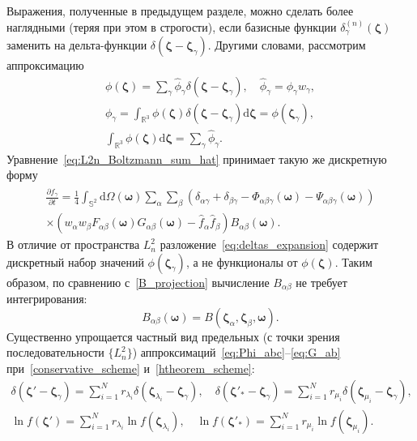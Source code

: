 \documentclass{article}
\newcommand{\dd}{\mathrm{d}}
\newcommand{\pder}[2][]{\frac{\partial#1}{\partial#2}}
\newcommand{\dzeta}{\boldsymbol{\dd\zeta}}
\newcommand{\bzeta}{\boldsymbol{\zeta}}
\newcommand{\bomega}{\boldsymbol{\omega}}
\begin{document}
Выражения, полученные в предыдущем разделе, можно сделать более наглядными (теряя при этом в строгости),
если базисные функции \(\delta^{(n)}_\gamma(\bzeta)\) заменить на дельта-функции \(\delta(\bzeta-\bzeta_\gamma)\).
Другими словами, рассмотрим аппроксимацию
\begin{gather}
    \phi(\bzeta) = \sum_\gamma \hat{\phi}_\gamma \delta(\bzeta-\bzeta_\gamma),
    \quad \hat{\phi}_\gamma = \phi_\gamma w_\gamma, \label{eq:deltas_expansion} \\
    \phi_\gamma = \int_{\mathbb{R}^3} \phi(\bzeta) \delta(\bzeta-\bzeta_\gamma) \dzeta = \phi(\bzeta_\gamma), \label{eq:deltas_coords} \\
    \int_{\mathbb{R}^3} \phi(\bzeta)\dzeta = \sum_\gamma \hat{\phi}_\gamma. \label{eq:deltas_integral}
\end{gather}
Уравнение~\eqref{eq:L2n_Boltzmann_sum_hat} принимает такую же дискретную форму
\begin{multline}\label{eq:deltas_Boltzmann_sum_hat}
    \pder[\hat{f}_\gamma]{t} =
        \frac14\int_{\mathbb{S}^2}\dd\Omega(\bomega) \sum_\alpha \sum_\beta
        \left(\delta_{\alpha\gamma} + \delta_{\beta\gamma}
            - \Phi_{\alpha\beta\gamma}(\bomega) - \Psi_{\alpha\beta\gamma}(\bomega)\right) \\
        \times\left(w_\alpha w_\beta F_{\alpha\beta}(\bomega)G_{\alpha\beta}(\bomega)
            - \hat{f}_\alpha \hat{f}_\beta\right)
        B_{\alpha\beta}(\bomega).
\end{multline}
В отличие от пространства \(L^2_n\) разложение~\eqref{eq:deltas_expansion} содержит дискретный набор значений \(\phi(\bzeta_\gamma)\),
а не функционалы от \(\phi(\bzeta)\). Таким образом, по сравнению с~\eqref{B_projection} вычисление \(B_{\alpha\beta}\)
не требует интегрирования:
\begin{equation}\label{B_exact}
    B_{\alpha\beta}(\bomega) = B(\bzeta_\alpha,\bzeta_\beta,\bomega).
\end{equation}
Существенно упрощается частный вид предельных (с точки зрения последовательности \(\{L^2_n\}\))
аппроксимаций~\eqref{eq:Phi_abc}--\eqref{eq:G_ab} при~\eqref{conservative_scheme} и~\eqref{htheorem_scheme}:
\begin{gather}
    \delta(\bzeta'-\bzeta_\gamma) = \sum_{i=1}^N r_{\lambda_i} \delta(\bzeta_{\lambda_i}-\bzeta_\gamma), \quad
    \delta(\bzeta'_*-\bzeta_\gamma) = \sum_{i=1}^N r_{\mu_i}\delta(\bzeta_{\mu_i}-\bzeta_\gamma), \label{deltas_conservative}\\
    \ln f(\bzeta') = \sum_{i=1}^N r_{\lambda_i} \ln f(\bzeta_{\lambda_i}), \quad
    \ln f(\bzeta'_*) = \sum_{i=1}^N r_{\mu_i} \ln f(\bzeta_{\mu_i}). \label{deltas_htheorem}
\end{gather}
\end{document}
